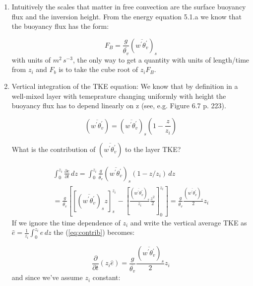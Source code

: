 \documentclass[12pt]{article}
\begin{document}
\begin{enumerate}
\item Intuitively the scales that matter in free convection are the surface buoyancy flux and the inversion height.
From the energy equation 5.1.a we know that the buoyancy flux has the form:

\begin{equation}
  \label{eq:buoyflux}
F_{B} =  \frac{ g }{\overline{ \theta_v}} \left (  \overline{ w^\prime \theta_v^\prime } \right )_s
\end{equation}
with units of $m^2\,s^{-3}$, the only way to get a quantity with units of length/time from $z_i$ and $F_b$ is to take the cube
root of $z_i F_B$.


\item Vertical integration of the TKE equation:  We know that by definition in
a well-mixed layer with temeprature changing uniformly with height the
buoyancy flux has to depend linearly on z (see, e.g. Figure 6.7 p. 223).

\begin{equation}
  \label{eq:linear}
 \left (\overline{ w^\prime \theta_v^\prime } \right ) =  \left (\overline{ w^\prime \theta_v^\prime } \right )_s  \left (    1 - \frac{ z}{z_i}  \right )
\end{equation}

What is the contribution of  $\left (\overline{ w^\prime \theta_v^\prime } \right )$ to the layer TKE?

\begin{equation}
  \label{eq:contrib}
  \begin{split}
  \int_{ 0}^{z_i} \frac{ \partial e}{\partial t} \!\,d z =\int_{ 0}^{z_i} \frac{ g }{\overline{\theta_v}} \left (\overline{ w^\prime \theta_v^\prime } \right )_s \left (   1 - z/z_i  \right )\, dz\\
 = \frac{ g }{\overline{\theta_v}}  \left [ \left [ \left (\overline{ w^\prime \theta_v^\prime } \right )_s z \right ]_s^{z_i}  
 - \left [ \frac{\left (\overline{ w^\prime \theta_v^\prime } \right )_s }{z_i} \frac{ z^2}{2} \right ]_0^{z_i}  \right ] = 
\frac{ g }{\overline{\theta_v}} \frac{\left (\overline{ w^\prime \theta_v^\prime } \right )_s  }{2} z_i  
  \end{split}
\end{equation}
If we ignore the time dependence of $z_i$ and write the vertical average TKE as $\hat{e} = \frac{ 1}{z_i} \int_{ 0}^{z_i} e\!\,d z$
the (\ref{eq:contrib}) becomes:

\begin{equation}
  \label{eq:contrib2}
  \frac{ \partial }{ \partial t} \left ( z_i \hat{e}  \right ) = \frac{ g }{\overline{\theta_v}} 
\frac{  \left (\overline{ w^\prime \theta_v^\prime } \right )_s }{2} z_i
\end{equation}
and since we've assume $z_i$ constant:


\end{enumerate}
\end{document}
